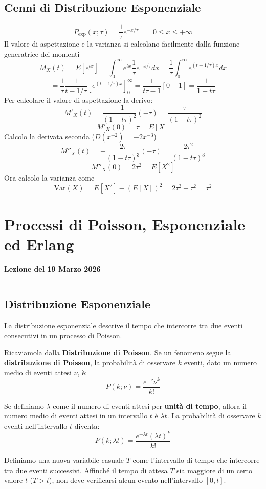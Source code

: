 \documentclass[openany,a4paper,12pt]{book}
\theoremstyle{remark}
\newcommand{\thelezione}{}
\newcommand{\lezione}[2]{
\newpage
\renewcommand{\thelezione}{#2} 
\section{#1} 
\noindent\textbf{\color{RoyalBlue}Lezione del #2}\par\vspace{0.5em}\hrule\vspace{1em}
}
\begin{document}
\subsection*{Cenni di Distribuzione Esponenziale}

\[
P_{\text{exp}}(x; \tau) = \frac{1}{\tau} e^{-x/\tau} \quad \quad 0 \le x \le +\infty
\]
Il valore di aspettazione e la varianza si calcolano facilmente dalla funzione generatrice dei momenti
\[
M_X(t) = E[e^{tx}] = \int_{0}^{\infty} e^{tx} \frac{1}{\tau} e^{-x/\tau} dx = \frac{1}{\tau} \int_{0}^{\infty} e^{(t - 1/\tau)x} dx
\]
\[
= \frac{1}{\tau} \frac{1}{t - 1/\tau} \left[ e^{(t - 1/\tau)x} \right]_0^\infty = \frac{1}{t\tau - 1} [0 - 1] = \frac{1}{1 - t\tau}
\]
Per calcolare il valore di aspettazione la derivo:
\[
M'_X(t) = \frac{-1}{(1 - t\tau)^2} (-\tau) = \frac{\tau}{(1 - t\tau)^2}
\]
\[
M'_X(0) = \tau = E[X]
\]
Calcolo la derivata seconda ($D(x^{-2}) = -2x^{-3}$)
\[
M''_X(t) = - \frac{2\tau}{(1 - t\tau)^3} (-\tau) = \frac{2\tau^2}{(1 - t\tau)^3}
\]
\[
M''_X(0) = 2\tau^2 = E[X^2]
\]
Ora calcolo la varianza come
\[
\text{Var}(X) = E[X^2] - (E[X])^2 = 2\tau^2 - \tau^2 = \tau^2
\]



\lezione{Processi di Poisson, Esponenziale ed Erlang}{19 Marzo 2026}
\subsection{Distribuzione Esponenziale}
La distribuzione esponenziale descrive il tempo che intercorre tra due eventi consecutivi in un processo di Poisson.

Ricaviamola dalla \textbf{Distribuzione di Poisson}.
Se un fenomeno segue la \textbf{distribuzione di Poisson}, la probabilità di osservare $k$ eventi, dato un numero medio di eventi attesi $\nu$, è:
\begin{equation}
    P(k; \nu) = \frac{e^{-\nu} \nu^k}{k!}
\end{equation}

Se definiamo $\lambda$ come il numero di eventi attesi per \textbf{unità di tempo}, allora il numero medio di eventi attesi in un intervallo $t$ è $\lambda t$. La probabilità di osservare $k$ eventi nell'intervallo $t$ diventa:
\begin{equation}
    P(k; \lambda t) = \frac{e^{-\lambda t} (\lambda t)^k}{k!}
\end{equation}

Definiamo una nuova variabile casuale $T$ come l'intervallo di tempo che intercorre tra due eventi successivi.
Affinché il tempo di attesa $T$ sia maggiore di un certo valore $t$ ($T > t$), non deve verificarsi alcun evento nell'intervallo $[0, t]$.
\end{document}
